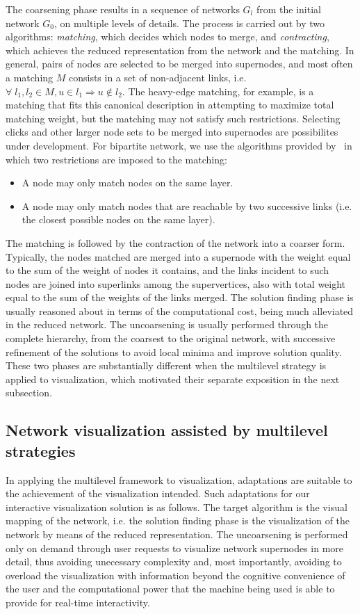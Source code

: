 \documentclass[runningheads]{llncs}
\begin{document}
The coarsening phase results in a sequence of networks $G_l$ from the initial network $G_0$,
on multiple levels of details.
The process is carried out by two algorithms: \emph{matching}, which decides which nodes to merge,
and \emph{contracting}, which achieves the reduced representation from the network and the matching.
In general, pairs of nodes are selected to be merged into supernodes, and
most often a matching $M$ consists in a set of non-adjacent links,
i.e. $\forall\; l_1, l_2 \in M, u \in l_1 \Rightarrow u \notin l_2$.
The heavy-edge matching, for example, is a matching that fits this canonical description
in attempting to maximize total matching weight, but the matching may not satisfy such restrictions.
Selecting clicks and other larger node sets to be merged into supernodes are possibilites
under development.
For bipartite network, we use the algorithms provided by~\cite{alan2} in which two restrictions
are imposed to the matching:
\begin{itemize}
  \item A node may only match nodes on the same layer.
  \item A node may only match nodes that are reachable by two successive links
    (i.e. the closest possible nodes on the same layer).
\end{itemize}

The matching is followed by the contraction of the network into a coarser form.
Typically, the nodes matched are merged into a supernode
with the weight equal to the sum of the weight of nodes it contains,
and the links incident to such nodes are joined into superlinks among the supervertices,
also with total weight equal to the sum of the weights of the links merged.
The solution finding phase is usually reasoned about in terms of the computational cost, being much
alleviated in the reduced network.
The uncoarsening is usually performed through the complete hierarchy,
from the coarsest to the original network, with successive refinement of the solutions to
avoid local minima and improve solution quality.
These two phases are substantially different when the multilevel strategy is applied to visualization,
which motivated their separate exposition in the next subsection.

\subsection{Network visualization assisted by multilevel strategies}\label{net}
In applying the multilevel framework to visualization, adaptations are suitable to
the achievement of the visualization intended.
Such adaptations for our interactive visualization solution is as follows.
The target algorithm is the visual mapping of the network,
i.e. the solution finding phase is the visualization of the network by means of
the reduced representation.
The uncoarsening is performed only on demand through user requests
to visualize network supernodes in more detail,
thus avoiding unecessary complexity and,
most importantly, avoiding to overload the visualization with information beyond the
cognitive convenience of the user and the computational power that the machine being used
is able to provide for real-time interactivity.
\end{document}
